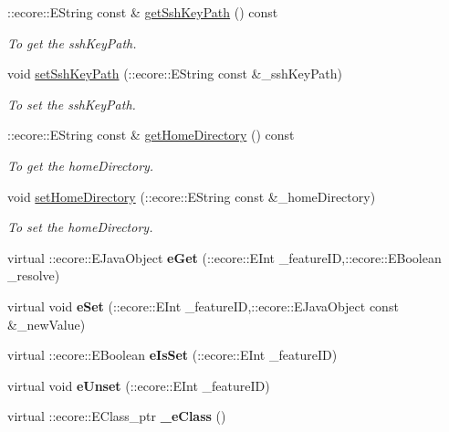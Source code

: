 \begin{DoxyCompactItemize}
::ecore::EString const \& \hyperlink{classUMS__Data_1_1LocalAccount_a7842352a28f3f1b9c60dedc428d507f9}{getSshKeyPath} () const 
\begin{DoxyCompactList}\small\item\em To get the sshKeyPath. \item\end{DoxyCompactList}\item 
void \hyperlink{classUMS__Data_1_1LocalAccount_a9345ef01f90cd0ffaca5826552910378}{setSshKeyPath} (::ecore::EString const \&\_\-sshKeyPath)
\begin{DoxyCompactList}\small\item\em To set the sshKeyPath. \item\end{DoxyCompactList}\item 
::ecore::EString const \& \hyperlink{classUMS__Data_1_1LocalAccount_a01305050b57aa124632b8f373e598a48}{getHomeDirectory} () const 
\begin{DoxyCompactList}\small\item\em To get the homeDirectory. \item\end{DoxyCompactList}\item 
void \hyperlink{classUMS__Data_1_1LocalAccount_a7bcfa02fae16b69cfe538be2843ca45b}{setHomeDirectory} (::ecore::EString const \&\_\-homeDirectory)
\begin{DoxyCompactList}\small\item\em To set the homeDirectory. \item\end{DoxyCompactList}\item 
\hypertarget{classUMS__Data_1_1LocalAccount_a770db1cdf1d16321b67735fea784bb6b}{
virtual ::ecore::EJavaObject {\bfseries eGet} (::ecore::EInt \_\-featureID,::ecore::EBoolean \_\-resolve)}
\label{classUMS__Data_1_1LocalAccount_a770db1cdf1d16321b67735fea784bb6b}

\item 
\hypertarget{classUMS__Data_1_1LocalAccount_ab7002d1158902aab3098dac3e1b20a12}{
virtual void {\bfseries eSet} (::ecore::EInt \_\-featureID,::ecore::EJavaObject const \&\_\-newValue)}
\label{classUMS__Data_1_1LocalAccount_ab7002d1158902aab3098dac3e1b20a12}

\item 
\hypertarget{classUMS__Data_1_1LocalAccount_ac786757f4ee0aa071eaa602d8e07bcc0}{
virtual ::ecore::EBoolean {\bfseries eIsSet} (::ecore::EInt \_\-featureID)}
\label{classUMS__Data_1_1LocalAccount_ac786757f4ee0aa071eaa602d8e07bcc0}

\item 
\hypertarget{classUMS__Data_1_1LocalAccount_abc2ac50cbe09f8b696887e0b736e8a0e}{
virtual void {\bfseries eUnset} (::ecore::EInt \_\-featureID)}
\label{classUMS__Data_1_1LocalAccount_abc2ac50cbe09f8b696887e0b736e8a0e}

\item 
\hypertarget{classUMS__Data_1_1LocalAccount_a7b7c5f5502dc05b8d758b5fe3ac4f9ea}{
virtual ::ecore::EClass\_\-ptr {\bfseries \_\-eClass} ()}
\label{classUMS__Data_1_1LocalAccount_a7b7c5f5502dc05b8d758b5fe3ac4f9ea}

\end{DoxyCompactItemize}
